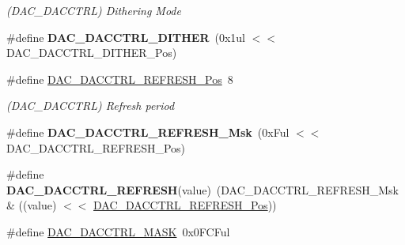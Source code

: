 \begin{DoxyCompactItemize}
\begin{DoxyCompactList}\small\item\em (D\+A\+C\+\_\+\+D\+A\+C\+C\+T\+R\+L) Dithering Mode \end{DoxyCompactList}\item 
\hypertarget{group___s_a_m_l21___d_a_c_ga588b9ac85119ed7dfbfeea72f77334d4}{}\#define {\bfseries D\+A\+C\+\_\+\+D\+A\+C\+C\+T\+R\+L\+\_\+\+D\+I\+T\+H\+E\+R}~(0x1ul $<$$<$ D\+A\+C\+\_\+\+D\+A\+C\+C\+T\+R\+L\+\_\+\+D\+I\+T\+H\+E\+R\+\_\+\+Pos)\label{group___s_a_m_l21___d_a_c_ga588b9ac85119ed7dfbfeea72f77334d4}

\item 
\hypertarget{group___s_a_m_l21___d_a_c_ga40153043ea62df2085c32f96ba056fca}{}\#define \hyperlink{group___s_a_m_l21___d_a_c_ga40153043ea62df2085c32f96ba056fca}{D\+A\+C\+\_\+\+D\+A\+C\+C\+T\+R\+L\+\_\+\+R\+E\+F\+R\+E\+S\+H\+\_\+\+Pos}~8\label{group___s_a_m_l21___d_a_c_ga40153043ea62df2085c32f96ba056fca}

\begin{DoxyCompactList}\small\item\em (D\+A\+C\+\_\+\+D\+A\+C\+C\+T\+R\+L) Refresh period \end{DoxyCompactList}\item 
\hypertarget{group___s_a_m_l21___d_a_c_ga3d9183dbfb728784f2ed562952a60245}{}\#define {\bfseries D\+A\+C\+\_\+\+D\+A\+C\+C\+T\+R\+L\+\_\+\+R\+E\+F\+R\+E\+S\+H\+\_\+\+Msk}~(0x\+Ful $<$$<$ D\+A\+C\+\_\+\+D\+A\+C\+C\+T\+R\+L\+\_\+\+R\+E\+F\+R\+E\+S\+H\+\_\+\+Pos)\label{group___s_a_m_l21___d_a_c_ga3d9183dbfb728784f2ed562952a60245}

\item 
\hypertarget{group___s_a_m_l21___d_a_c_ga16b719fc4e853b93591bae9d5b32a1aa}{}\#define {\bfseries D\+A\+C\+\_\+\+D\+A\+C\+C\+T\+R\+L\+\_\+\+R\+E\+F\+R\+E\+S\+H}(value)~(D\+A\+C\+\_\+\+D\+A\+C\+C\+T\+R\+L\+\_\+\+R\+E\+F\+R\+E\+S\+H\+\_\+\+Msk \& ((value) $<$$<$ \hyperlink{group___s_a_m_l21___d_a_c_ga40153043ea62df2085c32f96ba056fca}{D\+A\+C\+\_\+\+D\+A\+C\+C\+T\+R\+L\+\_\+\+R\+E\+F\+R\+E\+S\+H\+\_\+\+Pos}))\label{group___s_a_m_l21___d_a_c_ga16b719fc4e853b93591bae9d5b32a1aa}

\item 
\hypertarget{group___s_a_m_l21___d_a_c_ga3d9ce4bc003bffdea6fb98da402d2318}{}\#define \hyperlink{group___s_a_m_l21___d_a_c_ga3d9ce4bc003bffdea6fb98da402d2318}{D\+A\+C\+\_\+\+D\+A\+C\+C\+T\+R\+L\+\_\+\+M\+A\+S\+K}~0x0\+F\+C\+Ful\label{group___s_a_m_l21___d_a_c_ga3d9ce4bc003bffdea6fb98da402d2318}


\end{DoxyCompactItemize}

